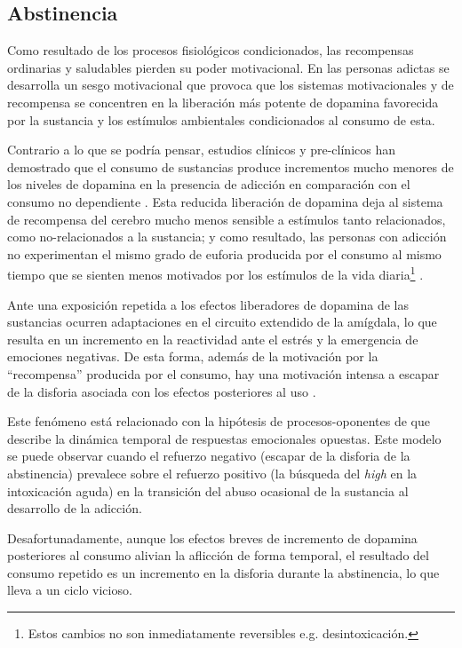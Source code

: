 \subsection{Abstinencia}
\label{abst}
Como resultado de los procesos fisiológicos condicionados, las recompensas ordinarias y saludables pierden su poder motivacional.
En las personas adictas se desarrolla un sesgo motivacional que provoca que los sistemas motivacionales y de recompensa se concentren en la liberación más potente de dopamina favorecida por la sustancia \textemdash{} y los estímulos ambientales condicionados al consumo de esta\parencite{Volkow2016}.\par
Contrario a lo que se podría pensar, estudios clínicos y pre-clínicos han demostrado que el consumo de sustancias produce incrementos mucho menores de los niveles de dopamina en la presencia de adicción en comparación con el consumo no dependiente \parencite{Volkow1997,Zhang2013,Volkow2014}.
Esta reducida liberación de dopamina deja al sistema de recompensa del cerebro mucho menos sensible a estímulos tanto relacionados, como no-relacionados a la sustancia; y como resultado, las personas con adicción no experimentan el mismo grado de euforia producida por el consumo al mismo tiempo que se sienten menos motivados por los estímulos de la vida diaria\footnote{Estos cambios no son inmediatamente reversibles e.g. desintoxicación.} \parencite{Volkow2016}.\par
Ante una exposición repetida a los efectos liberadores de dopamina de las sustancias ocurren adaptaciones en el circuito extendido de la amígdala, lo que resulta en un incremento en la reactividad ante el estrés y la emergencia de emociones negativas.
De esta forma, además de la motivación por la ``recompensa'' producida por el consumo, hay una motivación intensa a escapar de la disforia asociada con los efectos posteriores al uso \parencite{Goldstein2012a,Volkow2016}.\par
Este fenómeno está relacionado con la hipótesis de procesos-oponentes de \textcite{Solomon1978} que describe la dinámica temporal de respuestas emocionales opuestas.
Este modelo se puede observar cuando el refuerzo negativo (escapar de la disforia de la abstinencia) prevalece sobre el refuerzo positivo (la búsqueda del \textit{high} en la intoxicación aguda) en la transición del abuso ocasional de la sustancia al desarrollo de la adicción.\par
Desafortunadamente, aunque los efectos breves de incremento de dopamina posteriores al consumo alivian la aflicción de forma temporal, el resultado del consumo repetido es un incremento en la disforia durante la abstinencia, lo que lleva a un ciclo vicioso.

